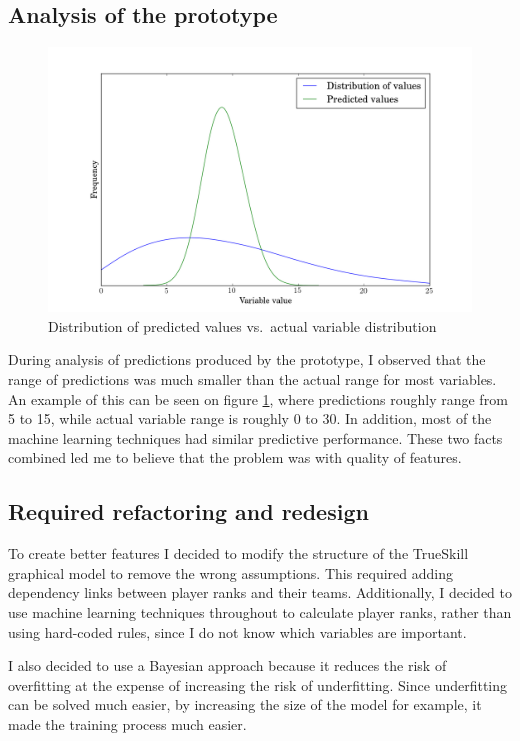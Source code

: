 \documentclass[12pt,a4paper]{book}
\begin{document}
\subsection{Analysis of the prototype}
\begin{figure}[ht]
\centering
\includegraphics[scale=0.5]{predicted_assists}
\caption{Distribution of predicted values vs.\ actual variable distribution}
\label{fig:variablerange}
\end{figure}
During analysis of predictions produced by the prototype, I observed that the range of predictions was much smaller than the actual range for most variables.
An example of this can be seen on figure \ref{fig:variablerange}, where predictions roughly range from 5 to 15, while actual variable range is roughly 0 to 30.
In addition, most of the machine learning techniques had similar predictive performance.
These two facts combined led me to believe that the problem was with quality of features.

\subsection{Required refactoring and redesign}
To create better features I decided to modify the structure of the TrueSkill graphical model to remove the wrong assumptions.
This required adding dependency links between player ranks and their teams.
Additionally, I decided to use machine learning techniques throughout to calculate player ranks, rather than using hard-coded rules, since I do not know which variables are important.

I also decided to use a Bayesian approach because it reduces the risk of overfitting at the expense of increasing the risk of underfitting.
Since underfitting can be solved much easier, by increasing the size of the model for example, it made the training process much easier.
\end{document}
